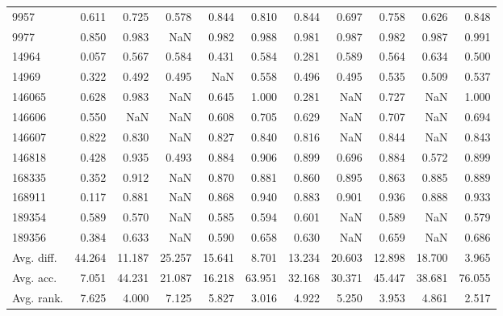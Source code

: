 \begin{tabular}{lrrrrrrrrrr}
9957 & 0.611 & 0.725 & 0.578 & 0.844 & 0.810 & 0.844 & 0.697 & 0.758 & 0.626 & 0.848 \\
9977 & 0.850 & 0.983 & NaN & 0.982 & 0.988 & 0.981 & 0.987 & 0.982 & 0.987 & 0.991 \\
14964 & 0.057 & 0.567 & 0.584 & 0.431 & 0.584 & 0.281 & 0.589 & 0.564 & 0.634 & 0.500 \\
14969 & 0.322 & 0.492 & 0.495 & NaN & 0.558 & 0.496 & 0.495 & 0.535 & 0.509 & 0.537 \\
146065 & 0.628 & 0.983 & NaN & 0.645 & 1.000 & 0.281 & NaN & 0.727 & NaN & 1.000 \\
146606 & 0.550 & NaN & NaN & 0.608 & 0.705 & 0.629 & NaN & 0.707 & NaN & 0.694 \\
146607 & 0.822 & 0.830 & NaN & 0.827 & 0.840 & 0.816 & NaN & 0.844 & NaN & 0.843 \\
146818 & 0.428 & 0.935 & 0.493 & 0.884 & 0.906 & 0.899 & 0.696 & 0.884 & 0.572 & 0.899 \\
168335 & 0.352 & 0.912 & NaN & 0.870 & 0.881 & 0.860 & 0.895 & 0.863 & 0.885 & 0.889 \\
168911 & 0.117 & 0.881 & NaN & 0.868 & 0.940 & 0.883 & 0.901 & 0.936 & 0.888 & 0.933 \\
189354 & 0.589 & 0.570 & NaN & 0.585 & 0.594 & 0.601 & NaN & 0.589 & NaN & 0.579 \\
189356 & 0.384 & 0.633 & NaN & 0.590 & 0.658 & 0.630 & NaN & 0.659 & NaN & 0.686 \\
Avg. diff. & 44.264 & 11.187 & 25.257 & 15.641 & 8.701 & 13.234 & 20.603 & 12.898 & 18.700 & 3.965 \\
Avg. acc. & 7.051 & 44.231 & 21.087 & 16.218 & 63.951 & 32.168 & 30.371 & 45.447 & 38.681 & 76.055 \\
Avg. rank. & 7.625 & 4.000 & 7.125 & 5.827 & 3.016 & 4.922 & 5.250 & 3.953 & 4.861 & 2.517 \\
\bottomrule
\end{tabular}
